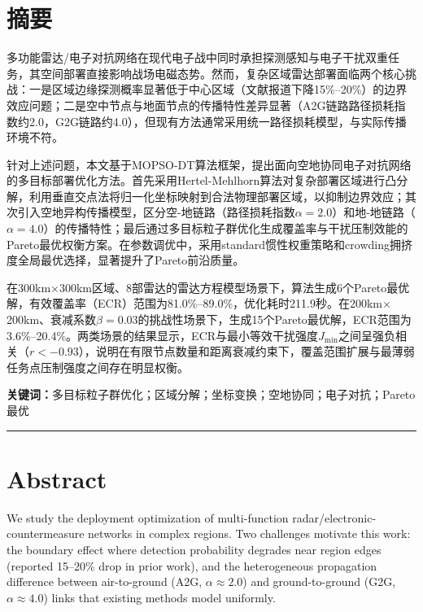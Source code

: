 \section{摘要}
\label{sec:abstract}

多功能雷达/电子对抗网络在现代电子战中同时承担探测感知与电子干扰双重任务，其空间部署直接影响战场电磁态势。然而，复杂区域雷达部署面临两个核心挑战：一是区域边缘探测概率显著低于中心区域（文献报道下降15\%--20\%）的边界效应问题；二是空中节点与地面节点的传播特性差异显著（A2G链路路径损耗指数约2.0，G2G链路约4.0），但现有方法通常采用统一路径损耗模型，与实际传播环境不符。

针对上述问题，本文基于MOPSO-DT算法框架，提出面向空地协同电子对抗网络的多目标部署优化方法。首先采用Hertel-Mehlhorn算法对复杂部署区域进行凸分解，利用垂直交点法将归一化坐标映射到合法物理部署区域，以抑制边界效应；其次引入空地异构传播模型，区分空-地链路（路径损耗指数$\alpha=2.0$）和地-地链路（$\alpha=4.0$）的传播特性；最后通过多目标粒子群优化生成覆盖率与干扰压制效能的Pareto最优权衡方案。在参数调优中，采用standard惯性权重策略和crowding拥挤度全局最优选择，显著提升了Pareto前沿质量。

在300km$\times$300km区域、8部雷达的雷达方程模型场景下，算法生成6个Pareto最优解，有效覆盖率（ECR）范围为81.0\%--89.0\%，优化耗时211.9秒。在200km$\times$200km、衰减系数$\beta=0.03$的挑战性场景下，生成15个Pareto最优解，ECR范围为3.6\%--20.4\%。两类场景的结果显示，ECR与最小等效干扰强度$J_{\text{min}}$之间呈强负相关（$r<-0.93$），说明在有限节点数量和距离衰减约束下，覆盖范围扩展与最薄弱任务点压制强度之间存在明显权衡。

\textbf{关键词：}多目标粒子群优化；区域分解；坐标变换；空地协同；电子对抗；Pareto最优

\vspace{12pt}
\noindent\rule{\linewidth}{0.5pt}
\vspace{12pt}

\section*{Abstract}

We study the deployment optimization of multi-function radar/electronic-countermeasure networks in complex regions. Two challenges motivate this work: the boundary effect where detection probability degrades near region edges (reported 15--20\% drop in prior work), and the heterogeneous propagation difference between air-to-ground (A2G, $\alpha \approx 2.0$) and ground-to-ground (G2G, $\alpha \approx 4.0$) links that existing methods model uniformly.

